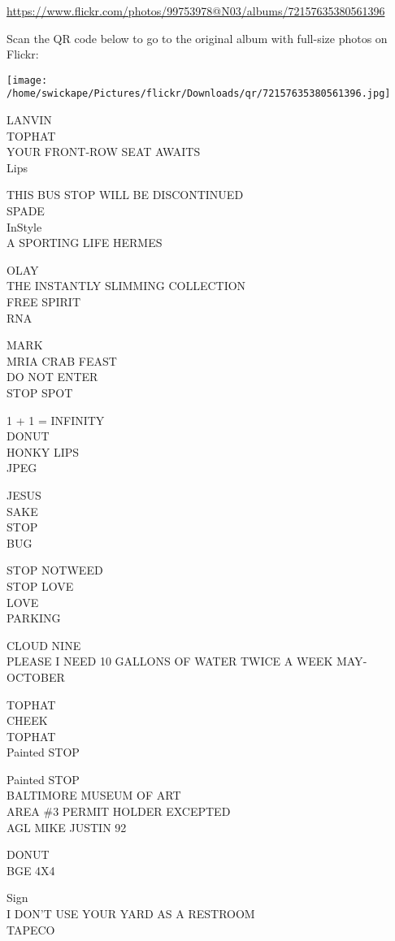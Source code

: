 \documentclass[10pt,letterpaper]{article}
\begin{document}
\url{https://www.flickr.com/photos/99753978@N03/albums/72157635380561396}

Scan the QR code below to go to the original album with full-size photos on Flickr:

\texttt{[image: /home/swickape/Pictures/flickr/Downloads/qr/72157635380561396.jpg]}
\pagebreak

LANVIN\\
TOPHAT\\
YOUR FRONT{-}ROW SEAT AWAITS\\
Lips

THIS BUS STOP WILL BE DISCONTINUED\\
SPADE\\
InStyle\\
A SPORTING LIFE HERMES

OLAY\\
THE INSTANTLY SLIMMING COLLECTION\\
FREE SPIRIT\\
RNA

MARK\\
MRIA CRAB FEAST\\
DO NOT ENTER\\
STOP SPOT

1 + 1 = INFINITY\\
DONUT\\
HONKY LIPS\\
JPEG

JESUS\\
SAKE\\
STOP\\
BUG

STOP NOTWEED\\
STOP LOVE\\
LOVE\\
PARKING

CLOUD NINE\\
PLEASE I NEED 10 GALLONS OF WATER TWICE A WEEK MAY{-}OCTOBER

TOPHAT\\
CHEEK\\
TOPHAT\\
Painted STOP

Painted STOP\\
BALTIMORE MUSEUM OF ART\\
AREA \#3 PERMIT HOLDER EXCEPTED\\
AGL MIKE JUSTIN 92

DONUT\\
BGE 4X4

Sign\\
I DON'T USE YOUR YARD AS A RESTROOM\\
TAPECO
\end{document}
